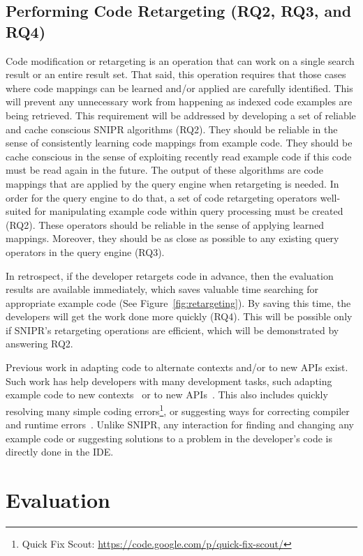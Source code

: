 \documentclass[conference]{IEEEtran}
\begin{document}
\subsection{Performing Code Retargeting (RQ2, RQ3, and RQ4)}
\label{sec:restqs}
Code modification or retargeting is an operation that can work on a single search result or an entire result set. That said, this operation requires that those cases where code mappings can be learned and/or applied are carefully identified. This will prevent any unnecessary work from happening as indexed code examples are being retrieved. This requirement will be addressed by developing a set of reliable and cache conscious \uppercase{SnipR} algorithms (RQ2). They should be reliable in the sense of consistently learning code mappings from example code. They should be cache conscious in the sense of exploiting recently read example code if this code must be read again in the future. The output of these algorithms are code mappings that are applied by the query engine when retargeting is needed. In order for the query engine to do that, a set of code retargeting operators well-suited for manipulating example code within query processing must be created (RQ2). These operators should be reliable in the sense of applying learned mappings. Moreover, they should be as close as possible to any existing query operators in the query engine (RQ3). 

In retrospect, if the developer retargets code in advance, then the evaluation results are available immediately, which saves valuable time searching for appropriate example code (See Figure~\ref{fig:retargeting}). By saving this time, the developers will get the work done more quickly (RQ4). This will be possible only if \uppercase{SnipR}'s retargeting operations are efficient, which will be demonstrated by answering RQ2. 

Previous work in adapting code to alternate contexts and/or to new APIs exist. Such work has help developers with many development tasks, such adapting example code to new contexts~\cite{Wightman:2012gc} or to new APIs~\cite{Nita:2010en}. This also includes quickly resolving many simple coding errors\footnote{Quick Fix Scout: \url{https://code.google.com/p/quick-fix-scout/}}, or suggesting ways for correcting compiler and runtime errors~\cite{Hartmann:2010hx}. Unlike \uppercase{SnipR}, any interaction for finding and changing any example code or suggesting solutions to a problem in the developer's code is directly done in the IDE.

\section{Evaluation}
\label{sec:evaluate}
\end{document}
